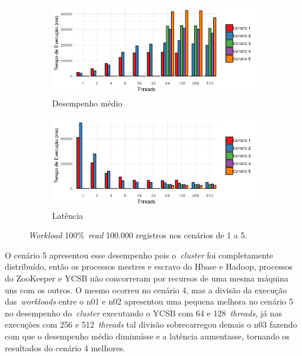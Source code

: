 \documentclass[12pt]{article}
\begin{document}
\begin{figure}
    \centering
    \begin{subfigure}[b]{0.49\textwidth}   
        \centering 
        \includegraphics[width=\textwidth]{images/figura13}
        \caption{Desempenho médio}
        \label{figura13}
    \end{subfigure}
    \begin{subfigure}[b]{0.49\textwidth}   
        \centering 
        \includegraphics[width=\textwidth]{images/figura14}
        \caption{Latência}
        \label{figura14}
    \end{subfigure}
    \caption{\emph{Workload} 100\%~\emph{read} 100.000 registros nos cenários de 1 a 5.}
\end{figure}

O cenário 5 apresentou esse desempenho pois o~\emph{cluster} foi completamente distribuído, então os processos mestres e escravo do Hbase e Hadoop, processos do ZooKeeper e YCSB não concorreram por recursos de uma mesma máquina uns com os outros. O mesmo ocorreu no cenário 4, mas a divisão da execução das~\emph{workloads} entre o n01 e n02 apresentou uma pequena melhora no cenário 5 no desempenho do~\emph{cluster} executando o YCSB com 64 e 128~\emph{threads}, já nas execuções com 256 e 512~\emph{threads} tal divisão sobrecarregou demais o n03 fazendo com que o desempenho médio diminuísse e a latência aumentasse, tornando os resultados do cenário 4 melhores.
\end{document}
